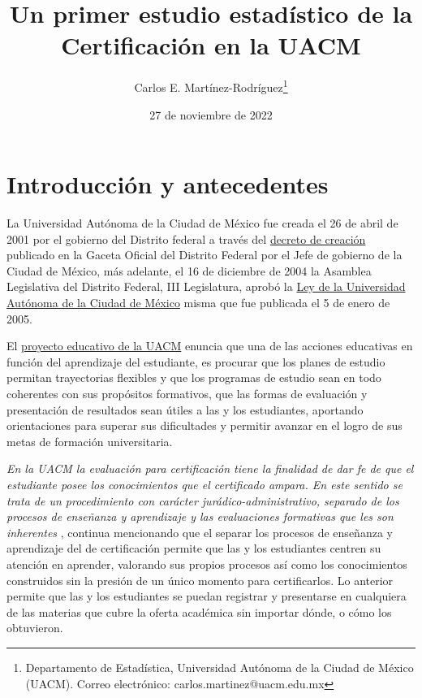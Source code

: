 \documentclass[12pt]{article}
\title{Un primer estudio estad\'istico de la Certificaci\'on en la UACM}
\author{Carlos E. Martínez-Rodríguez\thanks{Departamento de Estadística, Universidad Autónoma de la Ciudad de México (UACM). Correo electrónico: carlos.martinez@uacm.edu.mx}}
\date{27 de noviembre de 2022}
\begin{document}
\maketitle

\section{Introducci\'on y antecedentes}




La Universidad Aut\'onoma de la Ciudad de M\'exico fue creada el 26 de abril de 2001 por el gobierno del Distrito federal a trav\'es del \href{https://www.uacm.edu.mx/Portals/0/adam/Content/hfXbhKHHXE2k2Y8j2fG9UQ/Text/DCUACM.pdf}{decreto de creaci\'on} publicado en la Gaceta Oficial del Distrito Federal por el Jefe de gobierno de la Ciudad de M\'exico, m\'as adelante, el 16 de diciembre de 2004 la Asamblea Legislativa del Distrito Federal, III Legislatura, aprob\'o la \href{https://www.uacm.edu.mx/Portals/0/ley_uacm092011.pdf}{Ley de la Universidad Aut\'onoma de la Ciudad de M\'exico} misma que fue publicada el 5 de enero de 2005.


El \href{https://drive.google.com/file/d/0B6AEksrqo4h1M2Q5OWVhOGEtODNlNy00M2M2LThkNTctZjE0ZjA4ZGJlZWZj/view?resourcekey=0-9eA5mzOWlPqKF8MTeYH9Iw}{proyecto educativo de la UACM} enuncia que una de las acciones educativas en funci\'on del aprendizaje del estudiante, es procurar que los planes de estudio permitan trayectorias flexibles y que los programas de estudio sean en todo coherentes con sus prop\'ositos formativos, que las formas de evaluaci\'on y presentaci\'on de resultados sean \'utiles a las y los estudiantes, aportando orientaciones  para superar sus dificultades y permitir avanzar en el logro de sus metas de formaci\'on universitaria.


\textit{En la UACM la evaluaci\'on para certificaci\'on tiene la finalidad de dar fe de que el estudiante posee los conocimientos que el certificado ampara. En este sentido se trata de un procedimiento con car\'acter jur\'adico-administrativo, separado de los procesos de ense\~nanza y aprendizaje y las evaluaciones formativas que les son inherentes} \cite{ProyectoEducativo}, continua mencionando que el separar los procesos de ense\~nanza y aprendizaje del de certificaci\'on permite que las y los estudiantes centren su atenci\'on en aprender,  valorando sus propios procesos as\'i como los conocimientos construidos sin la presi\'on de un \'unico momento para certificarlos. Lo anterior permite que las y los estudiantes se puedan registrar y presentarse en cualquiera de las materias que cubre la oferta acad\'emica sin importar d\'onde, o c\'omo los obtuvieron. 
\end{document}
